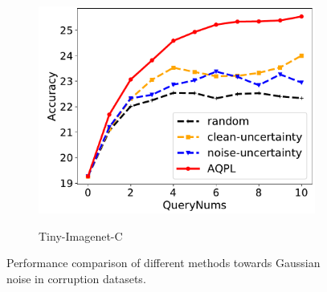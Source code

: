 \documentclass[letterpaper]{article} %
\begin{document}
\begin{figure}[!t]
	\begin{subfigure}{0.3\linewidth}
		\centering
		\label{fig.TinyImagenet.Gaussian}
		\includegraphics[width=1\textwidth]{img/Resnet18-TinyImageNet-GuassianNoise.pdf}\\
		\caption{Tiny-Imagenet-C}
	\end{subfigure}

	\caption{Performance comparison of different methods towards Gaussian noise in corruption datasets.}
	\label{fig.comp.Gaussian}
\end{figure}
\end{document}
